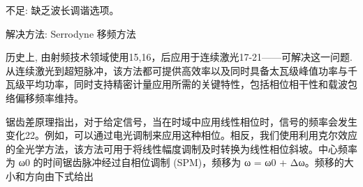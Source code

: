 \documentclass[14pt,a4paper,oneside]{article}
\numberwithin{equation}{subsection}             %
\numberwithin{figure}{subsection}               %
\begin{document}
不足: 缺乏波长调谐选项。 

解决方法: Serrodyne 移频方法

历史上, 由射频技术领域使用15,16，后应用于连续激光17-21——可解决这一问题. 从连续激光到超短脉冲，该方法都可提供高效率以及同时具备太瓦级峰值功率与千瓦级平均功率，同时支持精密计量应用所需的关键特性，包括相位相干性和载波包络偏移频率维持。

锯齿差原理指出，对于给定信号，当在时域中应用线性相位时，信号的频率会发生变化22。例如，可以通过电光调制来应用这种相位。相反，我们使用利用克尔效应的全光学方法，该方法可用于将线性幅度调制及时转换为线性相位斜坡。中心频率为 ω0 的时间锯齿脉冲经过自相位调制 (SPM)，频移为 ω = ω0 + Δω。频移的大小和方向由下式给出



\newpage

\clearpage           %
{}      %
{}   %


\end{document}
